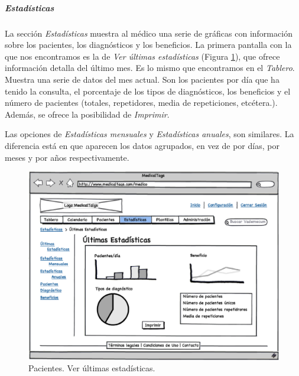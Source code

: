 		
		\medskip
		\subparagraph{Estadísticas} %
		\label{par:medico_estadisticas}
		
		La sección \textit{Estadísticas} muestra al médico una serie de gráficas con información sobre los pacientes, los diagnósticos y los beneficios. La primera pantalla con la que nos encontramos es la de \textit{Ver últimas estadísticas} (Figura \ref{fig:estadisticas_medico}), que ofrece información detalla del último mes. Es lo mismo que encontramos en el \textit{Tablero}. Muestra una serie de datos del mes actual. Son los pacientes por día que ha tenido la consulta, el porcentaje de los tipos de diagnósticos, los beneficios y el número de pacientes (totales, repetidores, media de repeticiones, etcétera.). Además, se ofrece la posibilidad de \textit{Imprimir}.
		
		Las opciones de \textit{Estadísticas mensuales} y \textit{Estadísticas anuales}, son similares. La diferencia está en que aparecen los datos agrupados, en vez de por días, por meses y por años respectivamente.
		
		
		
		
		\begin{figure}[H]
		  \centering
		    \includegraphics[width=12cm]{img/eps/19_Estadisticas_Medicos.eps}
		  \caption{Pacientes. Ver últimas estadísticas.}
		  \label{fig:estadisticas_medico}
		\end{figure}
		
